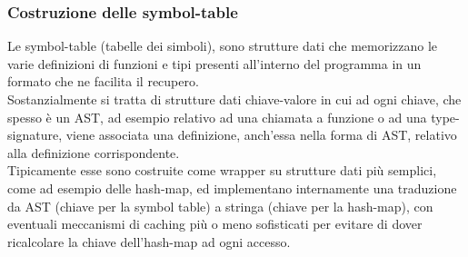 \subsubsection{Costruzione delle symbol-table}
Le symbol-table (tabelle dei simboli), sono strutture dati che memorizzano le varie definizioni 
di funzioni e tipi presenti all'interno del programma in un formato che ne facilita il recupero. \\ 

Sostanzialmente si tratta di strutture dati chiave-valore in cui ad ogni chiave, che spesso è un AST, ad esempio
relativo ad una chiamata a funzione o ad una type-signature, viene associata una definizione, anch'essa nella forma di 
AST, relativo alla definizione corrispondente. \\

Tipicamente esse sono costruite come wrapper su strutture dati più semplici, come ad esempio delle hash-map, 
ed implementano internamente una traduzione da AST (chiave per la symbol table) a stringa (chiave per la hash-map),
con eventuali meccanismi di caching più o meno sofisticati per evitare di dover ricalcolare la chiave dell'hash-map 
ad ogni accesso. \\